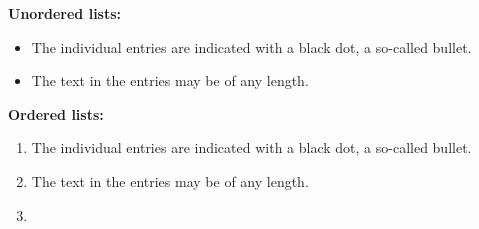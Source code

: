 \textbf{Unordered lists:}

\begin{itemize}
  \item The individual entries are indicated with a black dot, a so-called bullet.
  \item The text in the entries may be of any length.
\end{itemize}

\textbf{Ordered lists:}

\begin{enumerate}
  \item The individual entries are indicated with a black dot, a so-called bullet.
  \item The text in the entries may be of any length.
  \item \blindtext
\end{enumerate}

